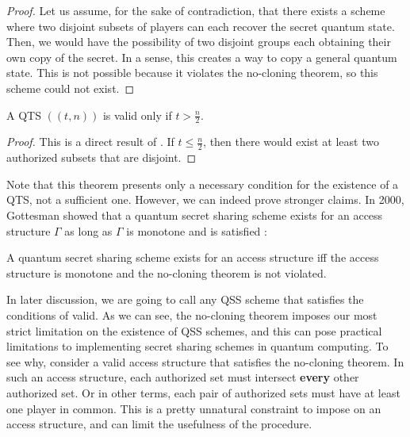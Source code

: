 \begin{proof}
    Let us assume, for the sake of contradiction, that there exists a scheme where two disjoint subsets of players can each recover the secret quantum state. Then, we would have the possibility of two disjoint groups each obtaining their own copy of the secret. In a sense, this creates a way to copy a general quantum state. This is not possible because it violates the no-cloning theorem, so this scheme could not exist.
\end{proof}

\begin{corollary}
    \label{cor:qts}
    A QTS $((t,n))$ is valid only if $t > \frac{n}{2}$.
\end{corollary}

\begin{proof}
    This is a direct result of . If $t \leq \frac{n}{2}$, then there would exist at least two authorized subsets that are disjoint. 
\end{proof}

Note that this theorem presents only a necessary condition for the existence of a QTS, not a sufficient one. However, we can indeed prove stronger claims. In 2000, Gottesman showed that a quantum secret sharing scheme exists for an access structure $\Gamma$ as long as $\Gamma$ is monotone and  is satisfied \cite{gottesman_theory_2000}:

\begin{theorem}
    \label{thm:monotone-gamma}
    A quantum secret sharing scheme exists for an access structure iff the access structure is monotone and the no-cloning theorem is not violated.
\end{theorem}

In later discussion, we are going to call any QSS scheme that satisfies the conditions of  valid. As we can see, the no-cloning theorem imposes our most strict limitation on the existence of QSS schemes, and this can pose practical limitations to implementing secret sharing schemes in quantum computing. To see why, consider a valid access structure that satisfies the no-cloning theorem. In such an access structure, each authorized set must intersect \textbf{every} other authorized set. Or in other terms, each pair of authorized sets must have at least one player in common. This is a pretty unnatural constraint to impose on an access structure, and can limit the usefulness of the procedure.

